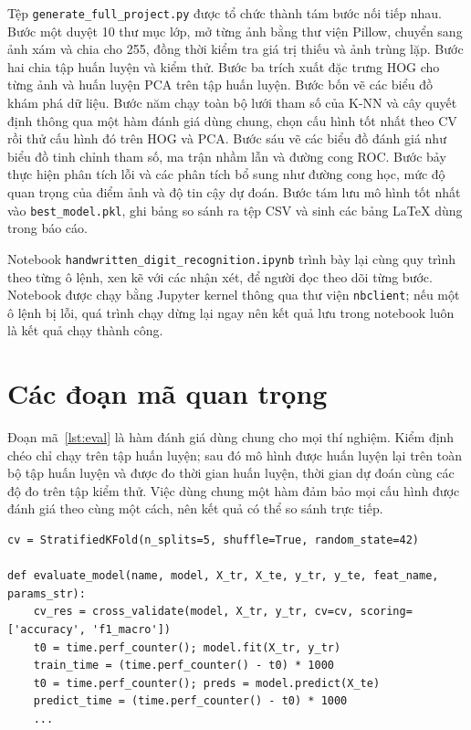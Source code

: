 \documentclass[a4paper,oneside]{report}
\begin{document}
Tệp \nolinkurl{generate_full_project.py} được tổ chức thành tám bước nối tiếp nhau. Bước một duyệt 10 thư mục lớp,
mở từng ảnh bằng thư viện Pillow, chuyển sang ảnh xám và chia cho 255, đồng thời kiểm tra giá trị thiếu và ảnh trùng
lặp. Bước hai chia tập huấn luyện và kiểm thử. Bước ba trích xuất đặc trưng HOG cho từng ảnh và huấn luyện PCA trên
tập huấn luyện. Bước bốn vẽ các biểu đồ khám phá dữ liệu. Bước năm chạy toàn bộ lưới tham số của K-NN và cây quyết
định thông qua một hàm đánh giá dùng chung, chọn cấu hình tốt nhất theo CV rồi thử cấu hình đó trên HOG và PCA.
Bước sáu vẽ các biểu đồ đánh giá như biểu đồ tinh chỉnh tham số, ma trận nhầm lẫn và đường cong ROC. Bước bảy thực
hiện phân tích lỗi và các phân tích bổ sung như đường cong học, mức độ quan trọng của điểm ảnh và độ tin cậy dự
đoán. Bước tám lưu mô hình tốt nhất vào \nolinkurl{best_model.pkl}, ghi bảng so sánh ra tệp CSV và sinh các bảng
\LaTeX{} dùng trong báo cáo.

Notebook \nolinkurl{handwritten_digit_recognition.ipynb} trình bày lại cùng quy trình theo từng ô lệnh, xen kẽ với
các nhận xét, để người đọc theo dõi từng bước. Notebook được chạy bằng Jupyter kernel thông qua thư viện
\texttt{nbclient}; nếu một ô lệnh bị lỗi, quá trình chạy dừng lại ngay nên kết quả lưu trong notebook luôn là kết
quả chạy thành công.

\section{Các đoạn mã quan trọng}

Đoạn mã~\ref{lst:eval} là hàm đánh giá dùng chung cho mọi thí nghiệm. Kiểm định chéo chỉ chạy trên tập huấn
luyện; sau đó mô hình được huấn luyện lại trên toàn bộ tập huấn luyện và được đo thời gian huấn luyện, thời gian
dự đoán cùng các độ đo trên tập kiểm thử. Việc dùng chung một hàm đảm bảo mọi cấu hình được đánh giá theo cùng
một cách, nên kết quả có thể so sánh trực tiếp.

\begin{lstlisting}[caption={Hàm đánh giá thống nhất}, label={lst:eval}]
cv = StratifiedKFold(n_splits=5, shuffle=True, random_state=42)

def evaluate_model(name, model, X_tr, X_te, y_tr, y_te, feat_name, params_str):
    cv_res = cross_validate(model, X_tr, y_tr, cv=cv, scoring=['accuracy', 'f1_macro'])
    t0 = time.perf_counter(); model.fit(X_tr, y_tr)
    train_time = (time.perf_counter() - t0) * 1000
    t0 = time.perf_counter(); preds = model.predict(X_te)
    predict_time = (time.perf_counter() - t0) * 1000
    ...
\end{lstlisting}
\end{document}
